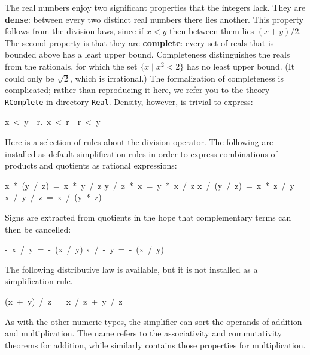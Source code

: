 %
The real numbers enjoy two significant properties that the integers lack. 
They are
\textbf{dense}: between every two distinct real numbers there lies another.
This property follows from the division laws, since if $x<y$ then between
them lies $(x+y)/2$.  The second property is that they are
\textbf{complete}: every set of reals that is bounded above has a least
upper bound.  Completeness distinguishes the reals from the rationals, for
which the set $\{x\mid x^2<2\}$ has no least upper bound.  (It could only be
$\surd2$, which is irrational.)
The formalization of completeness is complicated; rather than
reproducing it here, we refer you to the theory \texttt{RComplete} in
directory \texttt{Real}.
Density, however, is trivial to express:
\begin{isabelle}
x\ <\ y\ \isasymLongrightarrow \ \isasymexists r.\ x\ <\ r\ \isasymand \ r\ <\ y%
\end{isabelle}

Here is a selection of rules about the division operator.  The following
are installed as default simplification rules in order to express
combinations of products and quotients as rational expressions:
\begin{isabelle}
x\ *\ (y\ /\ z)\ =\ x\ *\ y\ /\ z
\isanewline
y\ /\ z\ *\ x\ =\ y\ *\ x\ /\ z
\isanewline
x\ /\ (y\ /\ z)\ =\ x\ *\ z\ /\ y
\isanewline
x\ /\ y\ /\ z\ =\ x\ /\ (y\ *\ z)
\end{isabelle}

Signs are extracted from quotients in the hope that complementary terms can
then be cancelled:
\begin{isabelle}
-\ x\ /\ y\ =\ -\ (x\ /\ y)
\isanewline
x\ /\ -\ y\ =\ -\ (x\ /\ y)
\end{isabelle}

The following distributive law is available, but it is not installed as a
simplification rule.
\begin{isabelle}
(x\ +\ y)\ /\ z\ =\ x\ /\ z\ +\ y\ /\ z%
\end{isabelle}

As with the other numeric types, the simplifier can sort the operands of
addition and multiplication.  The name  refers to the
associativity and commutativity theorems for addition, while similarly
 contains those properties for multiplication. 

